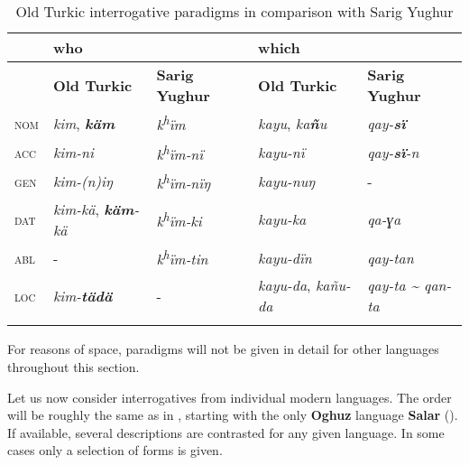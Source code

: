 \begin{table}[b]
\caption{Old Turkic interrogative paradigms \citep[211]{Erdal2004} in comparison with Sarig Yughur \citep[87]{Roos2000}}
\label{tab:turk:9}

\begin{tabularx}{\textwidth}{Xllll}
\lsptoprule
& \textbf{who} &  & \textbf{which} & \\
\midrule
& \textbf{Old Turkic} & \textbf{Sarig Yughur} & \textbf{Old Turkic} & \textbf{Sarig Yughur}\\
\textsc{nom} & \textit{kim}, \textbf{\textit{käm}} & \textit{k\textsuperscript{h}}\textit{ïm} & \textit{kayu}, \textit{ka}\textbf{\textit{ñ}}\textit{u} & \textit{qay-}\textbf{\textit{sï}}\\
\textsc{acc} & \textit{kim-ni} & \textit{k\textsuperscript{h}}\textit{ïm-nï} & \textit{kayu-nï} & \textit{qay-}\textbf{\textit{sï}}\textit{-n}\\
\textsc{gen} & \textit{kim-(n)iŋ} & \textit{k\textsuperscript{h}}\textit{ïm-nïŋ} & \textit{kayu-nuŋ} & -\\
\textsc{dat} & \textit{kim-kä}, \textbf{\textit{käm}}\textit{-kä} & \textit{k\textsuperscript{h}}\textit{ïm-ki} & \textit{kayu-ka} & \textit{qa-ɣa}\\
\textsc{abl} & - & \textit{k\textsuperscript{h}}\textit{ïm-tin} & \textit{kayu-dïn} & \textit{qay-tan}\\
\textsc{loc} & \textit{kim-}\textbf{\textit{tädä}} & - & \textit{kayu-da}, \textit{kañu-da} & \textit{qay-ta {\textasciitilde} qan-ta}\\
\lspbottomrule
\end{tabularx}
\end{table}

For reasons of space, paradigms will not be given in detail for other languages throughout this section.

\clearpage  
Let us now consider interrogatives from individual modern languages. The order will be roughly the same as in , starting with the only \textbf{Oghuz} language \textbf{Salar} (). If available, several descriptions are contrasted for any given language. In some cases only a selection of forms is given.

